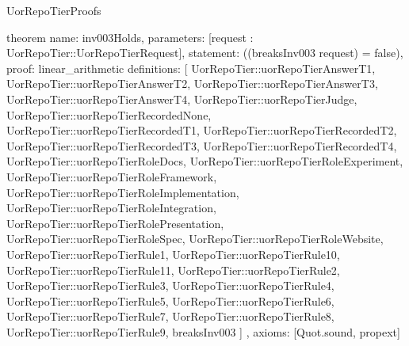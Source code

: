 \begin{lexlean}{UorRepoTierProofs}
\begin{semanticmodule}
theorem{
  name: inv003Holds,
  parameters: [request : UorRepoTier::UorRepoTierRequest],
  statement: ((breaksInv003 request) = false),
  proof: linear_arithmetic{
    definitions: [
      UorRepoTier::uorRepoTierAnswerT1,
      UorRepoTier::uorRepoTierAnswerT2,
      UorRepoTier::uorRepoTierAnswerT3,
      UorRepoTier::uorRepoTierAnswerT4,
      UorRepoTier::uorRepoTierJudge,
      UorRepoTier::uorRepoTierRecordedNone,
      UorRepoTier::uorRepoTierRecordedT1,
      UorRepoTier::uorRepoTierRecordedT2,
      UorRepoTier::uorRepoTierRecordedT3,
      UorRepoTier::uorRepoTierRecordedT4,
      UorRepoTier::uorRepoTierRoleDocs,
      UorRepoTier::uorRepoTierRoleExperiment,
      UorRepoTier::uorRepoTierRoleFramework,
      UorRepoTier::uorRepoTierRoleImplementation,
      UorRepoTier::uorRepoTierRoleIntegration,
      UorRepoTier::uorRepoTierRolePresentation,
      UorRepoTier::uorRepoTierRoleSpec,
      UorRepoTier::uorRepoTierRoleWebsite,
      UorRepoTier::uorRepoTierRule1,
      UorRepoTier::uorRepoTierRule10,
      UorRepoTier::uorRepoTierRule11,
      UorRepoTier::uorRepoTierRule2,
      UorRepoTier::uorRepoTierRule3,
      UorRepoTier::uorRepoTierRule4,
      UorRepoTier::uorRepoTierRule5,
      UorRepoTier::uorRepoTierRule6,
      UorRepoTier::uorRepoTierRule7,
      UorRepoTier::uorRepoTierRule8,
      UorRepoTier::uorRepoTierRule9,
      breaksInv003
    ]
  },
  axioms: [Quot.sound, propext]
}
\end{semanticmodule}
\end{lexlean}
